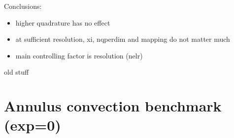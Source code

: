 Conclusions:
\begin{itemize}
\item higher quadrature has no effect
\item at sufficient resolution, xi, nqperdim and mapping do not matter much 
\item main controlling factor is resolution (nelr)
\end{itemize}












































\newpage









{\large old stuff}

\newpage
\section*{Annulus convection benchmark (exp=0)}


